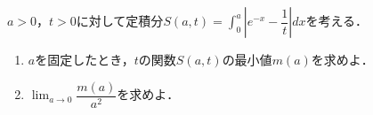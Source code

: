 \documentclass[../../main.tex]{subfiles}
\begin{document}
$a>0$，$t>0$に対して定積分$\displaystyle S(a,t)=\int_0^a \left| e^{-x}-\dfrac{1}{t} \right| dx$を考える．
\begin{enumerate}
  \item $a$を固定したとき，$t$の関数$S(a,t)$の最小値$m(a)$を求めよ．
  \item $\displaystyle\lim_{a \to 0}\dfrac{m(a)}{a^2}$を求めよ．
\end{enumerate}
\end{document}
